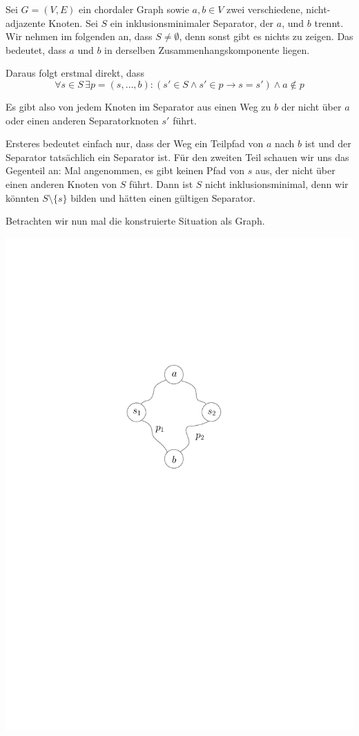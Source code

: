 
\subexercise
\label{sec:sep-clique}

Sei $G = (V,E)$ ein chordaler Graph sowie $a,b \in V$ zwei verschiedene, nicht-adjazente Knoten. Sei $S$ ein inklusionsminimaler Separator, der $a$, und $b$ trennt.
Wir nehmen im folgenden an, dass $S \neq \emptyset$, denn sonst gibt es nichts zu zeigen. Das bedeutet, dass $a$ und $b$ in derselben Zusammenhangskomponente liegen.

Daraus folgt erstmal direkt, dass $$\forall s \in S \, \exists p = (s, \dots, b) \colon (s' \in S \wedge s' \in p \rightarrow s = s') \wedge a \notin p$$

Es gibt also von jedem Knoten im Separator aus einen Weg zu $b$ der nicht über $a$ oder einen anderen Separatorknoten $s'$ führt.

Ersteres bedeutet einfach nur, dass der Weg ein Teilpfad von $a$ nach $b$ ist und der Separator tatsächlich ein Separator ist. Für den zweiten Teil schauen wir uns das Gegenteil an:
Mal angenommen, es gibt keinen Pfad von $s$ aus, der nicht über einen anderen Knoten von $S$ führt. Dann ist $S$ nicht inklusionsminimal, denn wir könnten $S \setminus \{s\}$ bilden und hätten einen gültigen Separator.

Betrachten wir nun mal die konstruierte Situation als Graph.

\begin{center}
    \vspace{1ex}
    \includegraphics[page=1]{fig/03-2a-pfade}
\end{center}

